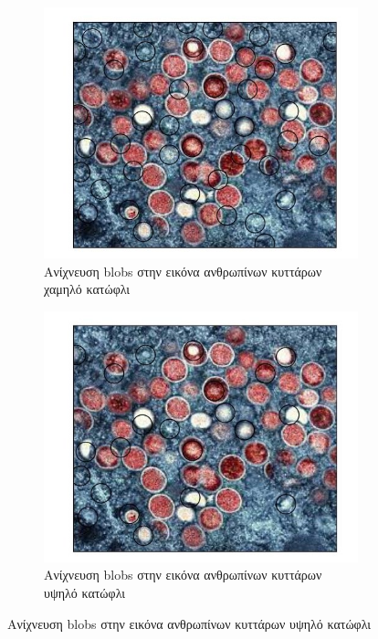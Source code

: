 \documentclass{article}
\newcommand{\eng}[1]{\foreignlanguage{english}{#1}}
\begin{document}
\begin{figure}[h]
    \centering
    \begin{subfigure}{.49\textwidth}
        \centering
        \includegraphics[width=\textwidth]{../image-plots/images-scaled/blob-detection-cells-bad-scaled.jpg}
        \caption{Aνίχνευση \eng{blobs} στην εικόνα ανθρωπίνων κυττάρων χαμηλό κατώφλι}
        \label{fig:cells-bad}
    \end{subfigure}
    \begin{subfigure}{.49\textwidth}
        \centering
        \includegraphics[width=\textwidth]{../image-plots/images-scaled/blob-detection-cells-good-scaled.jpg}
        \caption{Aνίχνευση \eng{blobs} στην εικόνα ανθρωπίνων κυττάρων υψηλό κατώφλι}
        \label{fig:cells-good}
    \end{subfigure}
\end{figure}
\FloatBarrier
\end{document}

